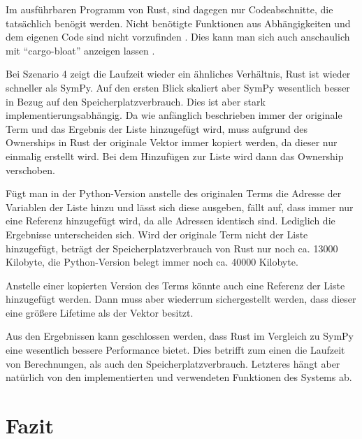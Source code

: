 \documentclass[11pt,a4paper, ngerman]{article}
\begin{document}
Im ausführbaren Programm von Rust, sind dagegen nur Codeabschnitte, die tatsächlich benögit werden. Nicht benötigte Funktionen aus Abhängigkeiten und dem eigenen Code sind nicht vorzufinden \cite{RustDeadCode1}. Dies kann man sich auch anschaulich mit ``cargo-bloat'' anzeigen lassen \cite{RustDeadCode2}.

Bei Szenario 4 zeigt die Laufzeit wieder ein ähnliches Verhältnis, Rust ist wieder schneller als SymPy. Auf den ersten Blick skaliert aber SymPy wesentlich besser in Bezug auf den Speicherplatzverbrauch. Dies ist aber stark implementierungsabhängig. Da wie anfänglich beschrieben immer der originale Term und das Ergebnis der Liste hinzugefügt wird, muss aufgrund des Ownerships in Rust der originale Vektor immer kopiert werden, da dieser nur einmalig erstellt wird. Bei dem Hinzufügen zur Liste wird dann das Ownership verschoben.

Fügt man in der Python-Version anstelle des originalen Terms die Adresse der Variablen der Liste hinzu und lässt sich diese ausgeben, fällt auf, dass immer nur eine Referenz hinzugefügt wird, da alle Adressen identisch sind. Lediglich die Ergebnisse unterscheiden sich. Wird der originale Term nicht der Liste hinzugefügt, beträgt der Speicherplatzverbrauch von Rust nur noch ca. 13000 Kilobyte, die Python-Version belegt immer noch ca. 40000 Kilobyte.

Anstelle einer kopierten Version des Terms könnte auch eine Referenz der Liste hinzugefügt werden. Dann muss aber wiederrum sichergestellt werden, dass dieser eine größere Lifetime als der Vektor besitzt.

Aus den Ergebnissen kann geschlossen werden, dass Rust im Vergleich zu SymPy eine wesentlich bessere Performance bietet. Dies betrifft zum einen die Laufzeit von Berechnungen, als auch den Speicherplatzverbrauch. Letzteres hängt aber natürlich von den implementierten und verwendeten Funktionen des Systems ab.

\newpage

\section{Fazit}
\end{document}
